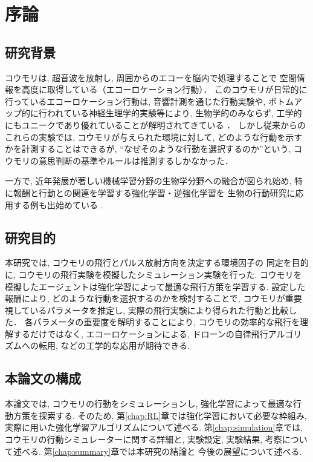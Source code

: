\documentclass[../main]{subfiles}
\begin{document}
\newpage
\chapter{序論}

\section{研究背景}
コウモリは, 超音波を放射し, 周囲からのエコーを脳内で処理することで
空間情報を高度に取得している（エコーロケーション行動）．
このコウモリが日常的に行っているエコーロケーション行動は, 
音響計測を通じた行動実験や, 
ボトムアップ的に行われている神経生理学的実験等により, 
生物学的のみならず, 
工学的にもユニークであり優れていることが解明されてきている
\cite{ref:bat_enhance}\cite{ref:echolocating_bats}．
しかし従来からのこれらの実験では, 
コウモリが与えられた環境に対して, 
どのような行動を示すかを計測することはできるが, 
“なぜそのような行動を選択するのか”という, 
コウモリの意思判断の基準やルールは推測するしかなかった．

一方で, 近年発展が著しい機械学習分野の生物学分野への融合が図られ始め, 
特に報酬と行動との関連を学習する強化学習・逆強化学習を
生物の行動研究に応用する例も出始めている
\cite{ref:simulating_bout}\cite{ref:can_ai}.


\section{研究目的}
本研究では, コウモリの飛行とパルス放射方向を決定する環境因子の
同定を目的に, コウモリの飛行実験を模擬したシミュレーション実験を行った.
コウモリを模擬したエージェントは強化学習によって最適な飛行方策を学習する.
設定した報酬により, どのような行動を選択するのかを検討することで, 
コウモリが重要視しているパラメータを推定し, 
実際の飛行実験により得られた行動と比較した．
各パラメータの重要度を解明することにより, 
コウモリの効率的な飛行を理解するだけではなく, 
エコーロケーションによる, 
ドローンの自律飛行アルゴリズムへの転用, 
などの工学的な応用が期待できる.

\section{本論文の構成}
本論文では, コウモリの行動をシミュレーションし, 
強化学習によって最適な行動方策を探索する.
そのため, 第\ref{chap:RL}章では強化学習において必要な枠組み, 
実際に用いた強化学習アルゴリズムについて述べる.
第\ref{chap:simulation}章では, 
コウモリの行動シミュレーターに関する詳細と, 
実験設定, 実験結果, 考察について述べる.
第\ref{chap:summary}章では本研究の結論と
今後の展望について述べる.
\end{document}
